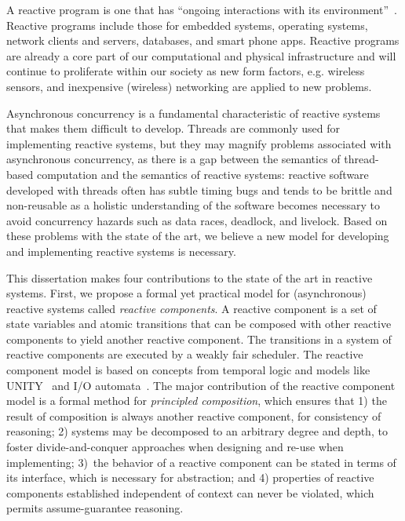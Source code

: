 A reactive program is one that has ``ongoing interactions with its environment''~\cite{manna1992temporal}.
Reactive programs include those for embedded systems, operating systems, network clients and servers, databases, and smart phone apps.
Reactive programs are already a core part of our computational and physical infrastructure and will continue to proliferate within our society as new form factors, e.g. wireless sensors, and inexpensive (wireless) networking are applied to new problems.

Asynchronous concurrency is a fundamental characteristic of reactive systems that makes them difficult to develop.
Threads are commonly used for implementing reactive systems, but they may magnify problems associated with asynchronous concurrency, as there is a gap between the semantics of thread-based computation and the semantics of reactive systems:  reactive software developed with threads often has subtle timing bugs and tends to be brittle and non-reusable as a holistic understanding of the software becomes necessary to avoid concurrency hazards such as data races, deadlock, and livelock.
Based on these problems with the state of the art, we believe a new model for developing and implementing reactive systems is necessary.

This dissertation makes four contributions to the state of the art in reactive systems.
First, we propose a formal yet practical model for (asynchronous) reactive systems called \emph{reactive components}.
A reactive component is a set of state variables and atomic transitions that can be composed with other reactive components to yield another reactive component.
The transitions in a system of reactive components are executed by a weakly fair scheduler.
The reactive component model is based on concepts from temporal logic and models like UNITY~\cite{chandy1989parallel} and I/O automata~\cite{nancy1996distributed}.
The major contribution of the reactive component model is a formal method for \emph{principled composition}, which ensures that 1) the result of composition is always another reactive component, for consistency of reasoning; 2) systems may be decomposed to an arbitrary degree and depth, to foster divide-and-conquer approaches when designing and re-use when implementing; 3)~the behavior of a reactive component can be stated in terms of its interface, which is necessary for abstraction; and 4) properties of reactive components established independent of context can never be violated, which permits assume-guarantee reasoning.

